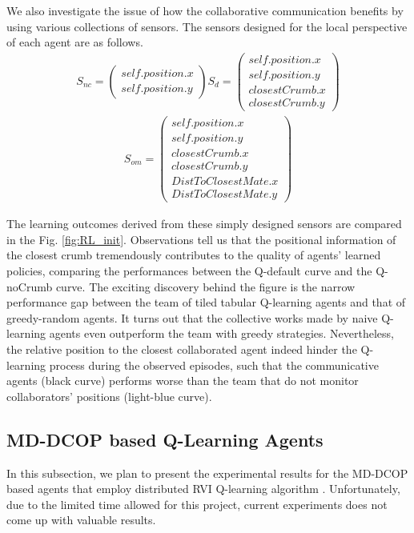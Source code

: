 \documentclass[conference]{IEEEtran}
\begin{document}
We also investigate the issue of how the collaborative communication benefits
by using various collections of sensors.
The sensors designed for the local perspective of each agent are as follows. 
\begin{align}
    S_{nc} = \left( \begin{array}{c}
      self.position.x \\
      self.position.y 
  \end{array} \right)
    S_{d} = \left( \begin{array}{c}
      self.position.x \\
      self.position.y \\
      closestCrumb.x \\
      closestCrumb.y 
  \end{array} \right)
    \nonumber
\end{align}
\begin{align}
        S_{om} = \left( \begin{array}{c}
      self.position.x \\
      self.position.y \\
      closestCrumb.x \\
      closestCrumb.y  \\
      DistToClosestMate.x \\
      DistToClosestMate.y 
  \end{array} \right)
        \nonumber
\end{align}

The learning outcomes derived from these simply designed sensors are compared
in the Fig. \ref{fig:RL_init}. 
Observations tell us that the positional information of the closest crumb
tremendously contributes to the quality of agents' learned policies, comparing
the performances between the Q-default curve and the Q-noCrumb curve. 
 The exciting discovery behind the figure is the narrow performance gap
 between the team of tiled tabular Q-learning agents and that of greedy-random
 agents. It turns out that the collective works made by naive Q-learning
 agents even outperform the team with greedy strategies.
Nevertheless, the relative position to the closest collaborated agent indeed
hinder the Q-learning process during the observed episodes, such that the
communicative agents (black curve) performs worse than the team that do not
monitor collaborators' positions (light-blue curve).

\subsection{MD-DCOP based Q-Learning Agents}
In this subsection, we plan to present the experimental results for the
 MD-DCOP based agents that employ distributed RVI Q-learning algorithm
 \cite{nguyen2014decentralized}. 
 Unfortunately, due to the limited time allowed for this project, current
 experiments does not come up with valuable results.
\end{document}
